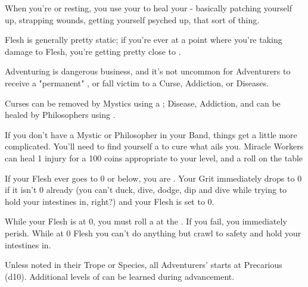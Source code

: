 {When you're  or resting, you use your \FLESH to heal your  - basically patching yourself up, strapping wounds, getting yourself psyched up, that sort of thing.  

Flesh is generally pretty static; if you're ever at a point where you're taking damage to Flesh, you're getting pretty close to .


  Adventuring is dangerous business, and it's not uncommon for Adventurers to receive a "permanent" , or fall victim to a Curse, Addiction, or Diseases.

  Curses can be removed by Mystics using a ;  Disease, Addiction, and  can be healed by Philosophers using . 

  If you don't have a Mystic or Philosopher in your Band, things get a little more complicated.  You'll need to find yourself a  to cure what ails you.  Miracle Workers can heal 1 injury for a 100 coins appropriate to your level, and a roll on the
   table




  If your Flesh ever goes to 0 or below, you are .  Your Grit immediately drops to 0 if it isn't 0 already (you can't duck, dive, dodge, dip and dive while trying to hold your intestines in, right?) and your Flesh is set to 0.

  While your Flesh is at 0, you must roll a \DEATH at the .  If you fail, you immediately perish.  While at 0 Flesh you can't do anything but crawl to safety and hold your intestines in.

  Unless noted in their Trope or Species, all Adventurers' \DEATH starts at Precarious (d10).  Additional levels of \DEATH can be learned during advancement.



}
